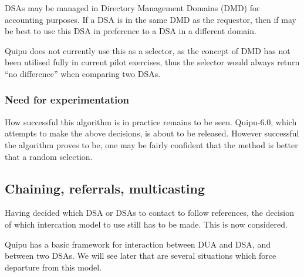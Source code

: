 DSAs may be managed in Directory Management Domains (DMD) for accounting
purposes.  If a DSA is in the same DMD as the requestor, then if may be best
to use this DSA in preference to a DSA in a different domain.

Quipu does not currently use this as a selector, as the concept of DMD has
not been utilised fully in current pilot exercises, thus the selector would
always return ``no difference'' when comparing two DSAs.
\subsubsection{Need for experimentation}

How successful this algorithm is in practice remains to be seen.
Quipu-6.0, which attempts to make the above decisions, is about to 
be released.
However successful the algorithm proves to be, one may be fairly confident
that the method is better that a random selection.
\subsection{Chaining, referrals, multicasting}

Having decided which DSA or DSAs to contact to follow references, the
decision of which intercation model to use still has to be made.  This is
now considered.

Quipu has a basic framework for interaction between DUA and DSA, and between
two DSAs.  We will see later that are several situations which force
departure from this model.  

